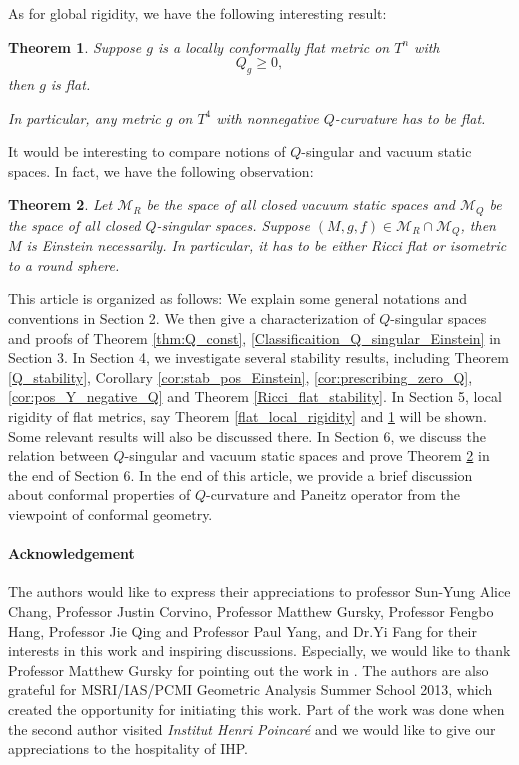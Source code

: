 \documentclass[12pt]{amsart}
\newtheorem{theorem}{Theorem}[section]
\theoremstyle{definition}
\theoremstyle{remark}
\numberwithin{equation}{section}
\begin{document}
As for global rigidity, we have the following interesting result:

\begin{theorem}\label{thm:rigidity_tori}
Suppose $g$ is a locally conformally flat metric on $T^n$ with $$Q_g \geq 0,$$ then $g$ is flat. 

In particular, any metric $g$ on $T^4$ with nonnegative $Q$-curvature has to be flat.
\end{theorem}

It would be interesting to compare notions of $Q$-singular and vacuum static spaces. In fact, we have the following observation:

\begin{theorem}\label{Q-static_R-static}
Let $\mathcal{M}_R$ be the space of all closed vacuum static spaces and $\mathcal{M}_Q$ be the space of all closed $Q$-singular spaces. 
Suppose $(M, g, f) \in \mathcal{M}_R \cap \mathcal{M}_Q$, then $M$ is Einstein necessarily. In particular, it has to be either Ricci flat or isometric to a round sphere.
\end{theorem}

This article is organized as follows: We explain some general notations and conventions in Section 2. We then give a characterization of $Q$-singular spaces and proofs of Theorem \ref{thm:Q_const}, \ref{Classificaition_Q_singular_Einstein} in Section 3. In Section 4, we investigate several stability results, including Theorem \ref{Q_stability}, Corollary \ref{cor:stab_pos_Einstein}, \ref{cor:prescribing_zero_Q}, \ref{cor:pos_Y_negative_Q} and Theorem \ref{Ricci_flat_stability}. In Section 5, local rigidity of flat metrics, say Theorem \ref{flat_local_rigidity} and \ref{thm:rigidity_tori} will be shown. Some relevant results will also be discussed there. In Section 6, we discuss the relation between $Q$-singular and vacuum static spaces and prove Theorem \ref{Q-static_R-static} in the end of Section 6. In the end of this article, we provide a brief discussion about conformal properties of $Q$-curvature and Paneitz operator from the viewpoint of conformal geometry.\\

\paragraph{\textbf{Acknowledgement}}
The authors would like to express their appreciations to professor Sun-Yung Alice Chang, Professor Justin Corvino,  Professor Matthew Gursky, Professor Fengbo Hang, Professor Jie Qing and Professor Paul Yang, and Dr.Yi Fang for their interests in this work and inspiring discussions. Especially, we would like to thank Professor Matthew Gursky for pointing out the work in \cite{C-G-Y}. The authors are also grateful for MSRI/IAS/PCMI Geometric Analysis Summer School 2013, which created the opportunity for initiating this work. Part of the work was done when the second author visited \emph{Institut Henri Poincar\'e} and we would like to give our appreciations to the hospitality of IHP. \\
\end{document}
